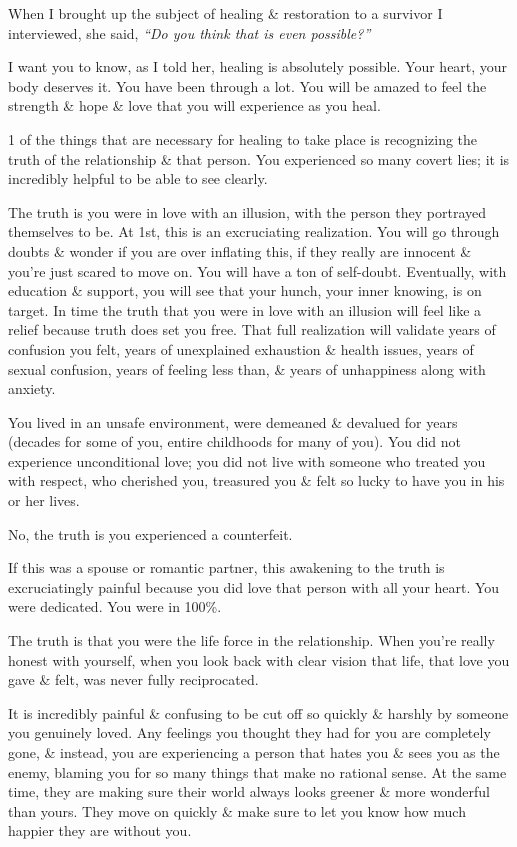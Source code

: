\documentclass{article}
\numberwithin{equation}{section}
\begin{document}
When I brought up the subject of healing \& restoration to a survivor I interviewed, she said, \textit{``Do you think that is even possible?''}

I want you to know, as I told her, healing is absolutely possible. Your heart, your body deserves it. You have been through a lot. You will be amazed to feel the strength \& hope \& love that you will experience as you heal.

1 of the things that are necessary for healing to take place is recognizing the truth of the relationship \& that person. You experienced so many covert lies; it is incredibly helpful to be able to see clearly.

The truth is you were in love with an illusion, with the person they portrayed themselves to be. At 1st, this is an excruciating realization. You will go through doubts \& wonder if you are over inflating this, if they really are innocent \& you're just scared to move on. You will have a ton of self-doubt. Eventually, with education \& support, you will see that your hunch, your inner knowing, is on target. In time the truth that you were in love with an illusion will feel like a relief because truth does set you free. That full realization will validate years of confusion you felt, years of unexplained exhaustion \& health issues, years of sexual confusion, years of feeling less than, \& years of unhappiness along with anxiety.

You lived in an unsafe environment, were demeaned \& devalued for years (decades for some of you, entire childhoods for many of you). You did not experience unconditional love; you did not live with someone who treated you with respect, who cherished you, treasured you \& felt so lucky to have you in his or her lives.

No, the truth is you experienced a counterfeit.

If this was a spouse or romantic partner, this awakening to the truth is excruciatingly painful because you did love that person with all your heart. You were dedicated. You were in 100\%.

The truth is that you were the life force in the relationship. When you're really honest with yourself, when you look back with clear vision that life, that love you gave \& felt, was never fully reciprocated.

It is incredibly painful \& confusing to be cut off so quickly \& harshly by someone you genuinely loved. Any feelings you thought they had for you are completely gone, \& instead, you are experiencing a person that hates you \& sees you as the enemy, blaming you for so many things that make no rational sense. At the same time, they are making sure their world always looks greener \& more wonderful than yours. They move on quickly \& make sure to let you know how much happier they are without you.
\end{document}
